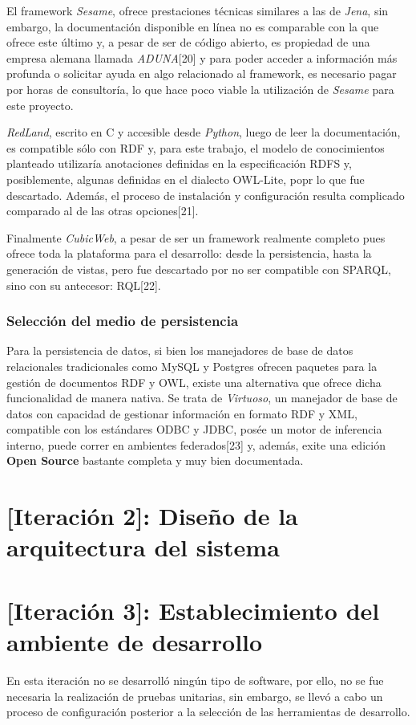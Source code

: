 El framework \textit{Sesame}, ofrece prestaciones técnicas similares a las de \textit{Jena}, sin embargo, la documentación disponible en línea no es comparable con la que ofrece este último y, a pesar de ser de código abierto, es propiedad de una empresa alemana llamada \textit{ADUNA}[20] y para poder acceder a información más profunda o solicitar ayuda en algo relacionado al framework, es necesario pagar por horas de consultoría, lo que hace poco viable la utilización de \textit{Sesame} para este proyecto.

\textit{RedLand}, escrito en C y accesible desde \textit{Python}, luego de leer la documentación, es compatible sólo con RDF y, para este trabajo, el modelo de conocimientos planteado utilizaría anotaciones definidas en la especificación RDFS y, posiblemente, algunas definidas en el dialecto OWL-Lite, popr lo que fue descartado. Además, el proceso de instalación y configuración resulta complicado comparado al de las otras opciones[21].

Finalmente \textit{CubicWeb}, a pesar de ser un framework realmente completo pues ofrece toda la plataforma para el desarrollo: desde la persistencia, hasta la generación de vistas, pero fue descartado por no ser compatible con SPARQL, sino con su antecesor: RQL[22].

\subsubsection{Selección del medio de persistencia}
Para la persistencia de datos, si bien los manejadores de base de datos relacionales tradicionales como MySQL y Postgres ofrecen paquetes para la gestión de documentos RDF y OWL, existe una alternativa que ofrece dicha funcionalidad de manera nativa. Se trata de \textit{Virtuoso}, un manejador de base de datos con capacidad de gestionar información en formato RDF y XML, compatible con los estándares ODBC y JDBC, posée un motor de inferencia interno, puede correr en ambientes federados[23] y, además, exite una edición \textbf{Open Source} bastante completa y muy bien documentada.

\section{[Iteración 2]: Diseño de la arquitectura del sistema}


\section{[Iteración 3]: Establecimiento del ambiente de desarrollo}
En esta iteración no se desarrolló ningún tipo de software, por ello, no se fue necesaria la realización de pruebas unitarias, sin embargo, se llevó a cabo un proceso de configuración posterior a la selección de las herramientas de desarrollo.

